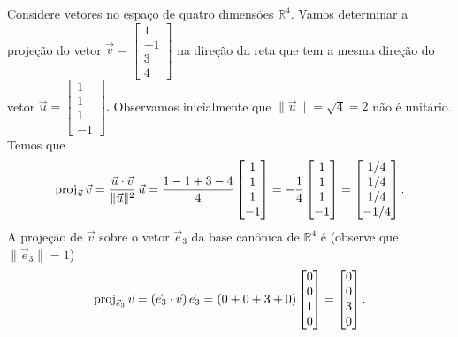 \documentclass[../livro.tex]{subfiles}  %
\begin{document}
\begin{example}\label{canon}
	Considere vetores no espaço de quatro dimensões $\mathbb{R}^4$. Vamos determinar a projeção do vetor $\vec{v} =
	\begin{bmatrix}
	1 \\ -1 \\ 3 \\ 4
	\end{bmatrix}$ na direção da reta que tem a mesma direção do vetor $\vec{u} =
	\begin{bmatrix}
	1 \\ 1 \\ 1 \\ -1
	\end{bmatrix}.$ Observamos inicialmente que $\|\vec{u}\| = \sqrt{4} = 2$ não é unitário. Temos que
	\begin{equation}
	\operatorname{proj}_{\vec{u}} \vec{v} =  \frac{\vec{u} \cdot \vec{v}}{\|\vec{u}\|^2} \, \vec{u} = \frac{1 - 1 + 3 - 4}{4}
	\begin{bmatrix}
	1 \\ 1 \\ 1 \\ -1
	\end{bmatrix} =
	-\frac{1}{4}
	\begin{bmatrix}
	1 \\ 1 \\ 1 \\ -1
	\end{bmatrix} =
	\begin{bmatrix}
	1/4 \\ 1/4 \\ 1/4 \\ -1/4
	\end{bmatrix}.
	\end{equation} A projeção de $\vec{v}$ sobre o vetor $\vec{e}_3$ da base canônica de $\mathbb{R}^4$ é (observe que $\|\vec{e}_3\| = 1$)
	\begin{equation}
	\proj_{\vec{e}_3} \vec{v} = (\vec{e}_3 \cdot \vec{v}) \, \vec{e}_3 = (0 + 0 + 3 + 0)
	\begin{bmatrix}
	0 \\ 0 \\ 1 \\ 0
	\end{bmatrix} = \begin{bmatrix}
	0 \\ 0 \\ 3 \\ 0
	\end{bmatrix}.

\end{equation}
\end{example}
\end{document}

